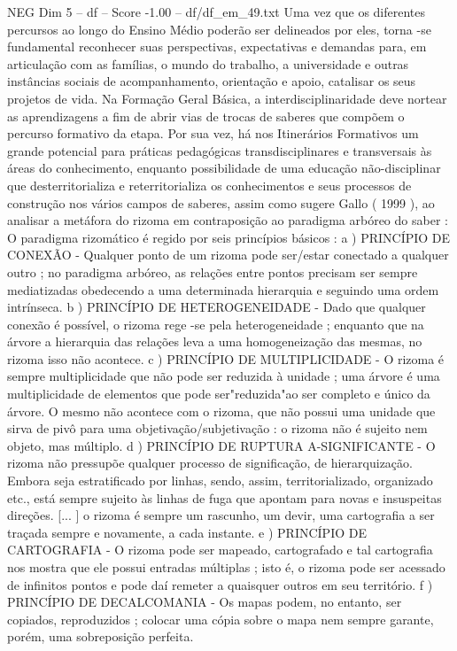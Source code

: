 \begin{textsample}{NEG Dim 5 – df – Score -1.00 – df/df\_em\_49.txt}
Uma vez que os diferentes percursos ao longo do Ensino Médio poderão ser delineados por eles, torna -se fundamental reconhecer suas perspectivas, expectativas e demandas para, em articulação com as famílias, o mundo do trabalho, a universidade e outras instâncias sociais de acompanhamento, orientação e apoio, catalisar os seus projetos de vida.
Na Formação Geral Básica, a interdisciplinaridade deve nortear as aprendizagens a fim de abrir vias de trocas de saberes que compõem o percurso formativo da etapa.
Por sua vez, há nos Itinerários Formativos um grande potencial para práticas pedagógicas transdisciplinares e transversais às áreas do conhecimento, enquanto possibilidade de uma educação não-disciplinar que desterritorializa e reterritorializa os conhecimentos e seus processos de construção nos vários campos de saberes, assim como sugere Gallo ( 1999 ), ao analisar a metáfora do rizoma em contraposição ao paradigma arbóreo do saber : O paradigma rizomático é regido por seis princípios básicos : a ) PRINCÍPIO DE CONEXÃO - Qualquer ponto de um rizoma pode ser/estar conectado a qualquer outro ; no paradigma arbóreo, as relações entre pontos precisam ser sempre mediatizadas obedecendo a uma determinada hierarquia e seguindo uma ordem intrínseca. b ) PRINCÍPIO DE HETEROGENEIDADE - Dado que qualquer conexão é possível, o rizoma rege -se pela heterogeneidade ; enquanto que na árvore a hierarquia das relações leva a uma homogeneização das mesmas, no rizoma isso não acontece. c ) PRINCÍPIO DE MULTIPLICIDADE - O rizoma é sempre multiplicidade que não pode ser reduzida à unidade ; uma árvore é uma multiplicidade de elementos que pode ser"reduzida"ao ser completo e único da árvore.
O mesmo não acontece com o rizoma, que não possui uma unidade que sirva de pivô para uma objetivação/subjetivação : o rizoma não é sujeito nem objeto, mas múltiplo. d ) PRINCÍPIO DE RUPTURA A-SIGNIFICANTE - O rizoma não pressupõe qualquer processo de significação, de hierarquização.
Embora seja estratificado por linhas, sendo, assim, territorializado, organizado etc., está sempre sujeito às linhas de fuga que apontam para novas e insuspeitas direções. [... ] o rizoma é sempre um rascunho, um devir, uma cartografia a ser traçada sempre e novamente, a cada instante. e ) PRINCÍPIO DE CARTOGRAFIA - O rizoma pode ser mapeado, cartografado e tal cartografia nos mostra que ele possui entradas múltiplas ; isto é, o rizoma pode ser acessado de infinitos pontos e pode daí remeter a quaisquer outros em seu território. f ) PRINCÍPIO DE DECALCOMANIA - Os mapas podem, no entanto, ser copiados, reproduzidos ; colocar uma cópia sobre o mapa nem sempre garante, porém, uma sobreposição perfeita.

\end{textsample}
